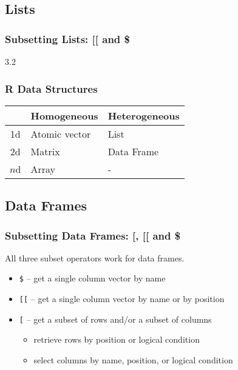 \documentclass{beamer}
\newcommand{\R}[1]{\texttt{#1}}
\begin{document}
\subsection{Lists}
\begin{frame}[fragile]
\frametitle{Subsetting Lists: [[ and \$}

\begin{Schunk}
\end{Schunk}
\pause
\begin{Schunk}
\begin{Soutput}
[1] 3.2
\end{Soutput}
\end{Schunk}

\end{frame}




\begin{frame}
\frametitle{R Data Structures}

\begin{table}
\begin{tabular}{c|ll}
   &  Homogeneous   & Heterogeneous \\ \hline
1d & Atomic vector &  List \\
2d & Matrix        & \cellcolor{gray!25} Data Frame \\
$n$d & Array       & - \\ 
\end{tabular}
\end{table}

\end{frame}

\subsection{Data Frames}

\begin{frame}
\frametitle{Subsetting Data Frames: [, [[ and \$}

All three subset operators work for data frames. 

\begin{itemize}
\item \R{\$} -- get a single column vector by name 
\item \R{[[} -- get a single column vector by name or by position
\item \R{[}  -- get a subset of rows and\slash or a subset of columns
\begin{itemize}\item retrieve rows by position or logical condition \item select columns by name, position, or logical condition \end{itemize}
\end{itemize}

\end{frame}
\end{document}
